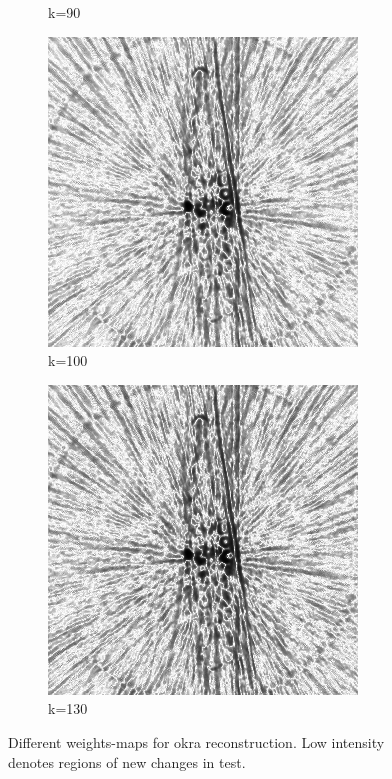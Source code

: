 \documentclass[journal]{IEEEtran}
\begin{document}
\begin{figure}[h]
\begin{subfigure}[b]{0.24\linewidth}
        \caption{k=90}
     \end{subfigure}
   \begin{subfigure}[b]{0.24\linewidth}
        \includegraphics[width=\textwidth]{../images/okra/post_TCI/2D/48_views/tuning_k/weightsIm_kk_100_lambda_prior_0.700000.png}
        \caption{k=100}
     \end{subfigure}
   \begin{subfigure}[b]{0.24\linewidth}
        \includegraphics[width=\textwidth]{../images/okra/post_TCI/2D/48_views/tuning_k/weightsIm_kk_130_lambda_prior_0.700000.png}
        \caption{k=130}
     \end{subfigure}
    \caption{Different weights-maps for okra reconstruction. Low intensity denotes regions of new changes in test.}
\label{fig:few_view_okra_2D_weights}
\end{figure}
\end{document}
